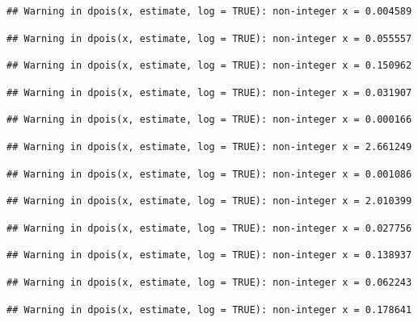 \documentclass[]{article}
\begin{document}
\begin{verbatim}
## Warning in dpois(x, estimate, log = TRUE): non-integer x = 0.004589
\end{verbatim}

\begin{verbatim}
## Warning in dpois(x, estimate, log = TRUE): non-integer x = 0.055557
\end{verbatim}

\begin{verbatim}
## Warning in dpois(x, estimate, log = TRUE): non-integer x = 0.150962
\end{verbatim}

\begin{verbatim}
## Warning in dpois(x, estimate, log = TRUE): non-integer x = 0.031907
\end{verbatim}

\begin{verbatim}
## Warning in dpois(x, estimate, log = TRUE): non-integer x = 0.000166
\end{verbatim}

\begin{verbatim}
## Warning in dpois(x, estimate, log = TRUE): non-integer x = 2.661249
\end{verbatim}

\begin{verbatim}
## Warning in dpois(x, estimate, log = TRUE): non-integer x = 0.001086
\end{verbatim}

\begin{verbatim}
## Warning in dpois(x, estimate, log = TRUE): non-integer x = 2.010399
\end{verbatim}

\begin{verbatim}
## Warning in dpois(x, estimate, log = TRUE): non-integer x = 0.027756
\end{verbatim}

\begin{verbatim}
## Warning in dpois(x, estimate, log = TRUE): non-integer x = 0.138937
\end{verbatim}

\begin{verbatim}
## Warning in dpois(x, estimate, log = TRUE): non-integer x = 0.062243
\end{verbatim}

\begin{verbatim}
## Warning in dpois(x, estimate, log = TRUE): non-integer x = 0.178641
\end{verbatim}
\end{document}
